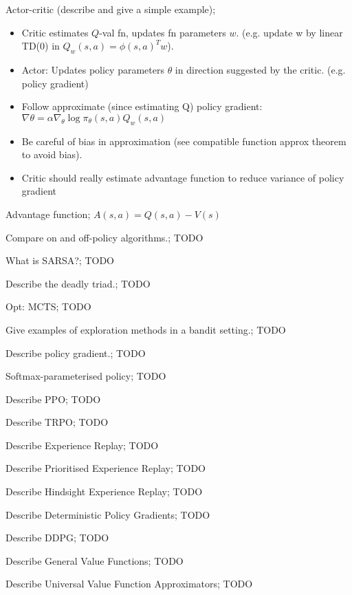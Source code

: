 \documentclass{article}
\begin{document}
Actor-critic (describe and give a simple example);\begin{itemize} \item Critic estimates $Q$-val fn, updates fn parameters $w$. (e.g. update w by linear TD(0) in $Q_w(s,a)=\phi(s,a)^Tw$). \item Actor: Updates policy parameters $\theta$ in direction suggested by the critic. (e.g. policy gradient) \item Follow approximate (since estimating Q) policy gradient: $\nabla\theta = \alpha\nabla_{\theta}\log\pi_\theta(s,a)Q_w(s,a)$ \item Be careful of bias in approximation (see compatible function approx theorem to avoid bias). \item Critic should really estimate advantage function to reduce variance of policy gradient \end{itemize}

Advantage function; $A(s,a)=Q(s,a)-V(s)$

Compare on and off-policy algorithms.; TODO

What is SARSA?; TODO

Describe the deadly triad.; TODO

Opt: MCTS; TODO

Give examples of exploration methods in a bandit setting.; TODO

Describe policy gradient.; TODO

Softmax-parameterised policy; TODO

Describe PPO; TODO

Describe TRPO; TODO

Describe Experience Replay; TODO

Describe Prioritised Experience Replay; TODO

Describe Hindsight Experience Replay; TODO

Describe Deterministic Policy Gradients; TODO

Describe DDPG; TODO

Describe General Value Functions; TODO

Describe Universal Value Function Approximators; TODO
\end{document}
